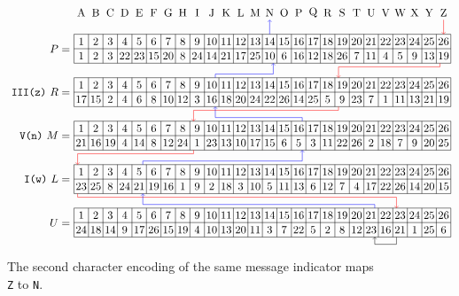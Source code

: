 \documentclass[m3380-lec-main.tex]{subfiles}
\begin{document}
\begin{exmp}
\begin{figure}[hbt]{\tiny
\[\begin{tikzpicture}[scale=12/26]
\draw \foreach \x/\c in {1/A, 2/B, 3/C, 4/D, 5/E, 6/F, 7/G, 8/H, 9/I, 10/J, 11/K, 12/L, 13/M, 14/N, 15/O, 16/P, 17/Q, 18/R, 19/S, 20/T, 21/U, 22/V, 23/W, 24/X, 25/Y, 26/Z}{ (\x-0.5,0.5) node {\c}};
\draw (0,-2) node [left] {$P=$};
\draw (0, -5) node [left] {\texttt{III(z)}~$R=$};
\draw (0, -8) node [left] {\texttt{V(n)}~$M=$};
\draw (0,-11) node [left] {\texttt{I(w)}~$L=$};
\draw (0,-14) node [left] {$U=$};
%
\draw (0,-3) grid (26,-1)
	\foreach \x in {1,...,26}{(\x-0.5,-1.5) node {\x}}
	\foreach \x/\c in {1/1, 2/2, 3/3, 4/22, 5/23, 6/15, 7/20, 8/8, 9/24, 10/14, 11/21, 12/17, 13/25, 14/10, 15/6, 16/16, 17/12, 18/18, 19/26, 20/7, 21/11, 22/4, 23/5, 24/9, 25/13, 26/19}{(\x-0.5,-2.5) node {\c}};
\draw (0,-6) grid (26,-4)
	\foreach \x in {1,...,26}{(\x-0.5,-4.5) node {\x}}
	\foreach \x/\c in {1/17, 2/15, 3/2, 4/4, 5/6, 6/8, 7/10, 8/12, 9/3, 10/16, 11/18, 12/20, 13/24, 14/22, 15/26, 16/14, 17/25, 18/5, 19/9, 20/23, 21/7, 22/1, 23/11, 24/13, 25/21, 26/19}{(\x-0.5,-5.5) node {\c}};
\draw (0,-9) grid (26,-7)
	\foreach \x in {1,...,26}{(\x-0.5,-7.5) node {\x}}
	\foreach \x/\c in {1/21, 2/16, 3/19, 4/4, 5/14, 6/8, 7/12, 8/24, 9/1, 10/23, 11/13, 12/10, 13/17, 14/15, 15/6, 16/5, 17/3, 18/11, 19/22, 20/26, 21/2, 22/18, 23/7, 24/9, 25/20, 26/25}{(\x-0.5,-8.5) node {\c}};
\draw (0,-12) grid (26,-10)
	\foreach \x in {1,...,26}{(\x-0.5,-10.5) node {\x}}
	\foreach \x/\c in {1/23, 2/25, 3/8, 4/24, 5/21, 6/19, 7/16, 8/1, 9/9, 10/2, 11/18, 12/3, 13/10, 14/5, 15/11, 16/13, 17/6, 18/12, 19/7, 20/4, 21/17, 22/22, 23/26, 24/14, 25/20, 26/15}{(\x-0.5,-11.5) node {\c}};
\draw (0,-15) grid (26,-13)
	\foreach \x in {1,...,26}{(\x-0.5,-13.5) node {\x}}
	\foreach \x/\c in {1/24, 2/18, 3/14, 4/9, 5/17, 6/26, 7/15, 8/19, 9/4, 10/10, 11/13, 12/20, 13/11, 14/3, 15/7, 16/22, 17/5, 18/2, 19/8, 20/12, 21/23, 22/16, 23/21, 24/1, 25/25, 26/6}{(\x-0.5,-14.5) node {\c}};
%
\draw [->, draw=red] (25.5,0) -- (25.5,-1);
\draw [->, draw=red] (25.25,-3) -- (25.25,-3.25) -- (18.25,-3.25) -- (18.25,-4);
\draw [->, draw=red] (18.25,-6) -- (18.25,-6.25) -- (8.25, -6.25) -- (8.25, -7);
\draw [->, draw=red] (8.25,-9) -- (8.25,-9.25) -- (0.25, -9.25) -- (0.25, -10);
\draw [->, draw=red] (0.25,-12) -- (0.25,-12.25) -- (22.25,-12.25) -- (22.25,-13);
\draw [->, draw=black] (22.25,-15) -- (22.25,-15.5) -- (20.75,-15.5) -- (20.75,-15);
\draw [->, draw=blue] (20.75,-13) -- (20.75,-12.75) -- (4.75,-12.75) -- (4.75,-12);
\draw [->, draw=blue] (4.75,-10) -- (4.75,-9.75) -- (15.75, -9.75) -- (15.75,-9);
\draw [->, draw=blue] (15.75,-7) -- (15.75, -6.75) -- (9.75,-6.75) -- (9.75,-6);
\draw [->, draw=blue] (9.75,-4) -- (9.75,-3.75) -- (13.75,-3.75) -- (13.75,-3);
\draw [->, draw=blue] (13.5,-1) -- (13.5,0);
\end{tikzpicture}\]}
\caption{\label{fig:enigma_2}The second character encoding of the same message indicator maps \texttt{Z} to \texttt{N}.}
\end{figure}


\end{exmp}
\end{document}

